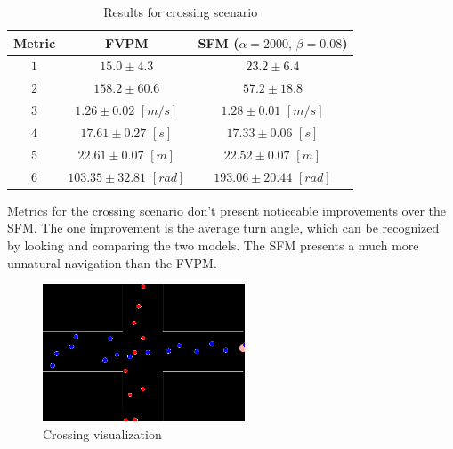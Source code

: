 \documentclass[english]{article}
\providecommand{\tabularnewline}{\\}
\begin{document}
    \begin{table}[H]
        \begin{centering}
            \begin{tabular}{|c|c|c|}
                \hline 
                Metric  & {\scriptsize{FVPM}} & {\scriptsize{SFM ($\alpha=2000,\,\beta=0.08$)}}\tabularnewline
                \hline 
                \hline 
                $1$  & {\scriptsize{$15.0\pm4.3$}} & {\scriptsize{$23.2\pm6.4$}}\tabularnewline
                \hline 
                $2$  & {\scriptsize{$158.2\pm60.6$}} & {\scriptsize{$57.2\pm18.8$}}\tabularnewline
                \hline 
                $3$  & {\scriptsize{$1.26\pm0.02$ $[m/s]$}} & {\scriptsize{$1.28\pm0.01$ $[m/s]$}}\tabularnewline
                \hline 
                $4$  & {\scriptsize{$17.61\pm0.27$ $[s]$}} & {\scriptsize{$17.33\pm0.06$ $[s]$}}\tabularnewline
                \hline 
                $5$  & {\scriptsize{$22.61\pm0.07$ $[m]$}} & {\scriptsize{$22.52\pm0.07$ $[m]$}}\tabularnewline
                \hline 
                $6$  & {\scriptsize{$103.35\pm32.81$ $[rad]$}} & {\scriptsize{$193.06\pm20.44$ $[rad]$}}\tabularnewline
                \hline 
            \end{tabular}
        \par\end{centering}
        \caption{Results for crossing scenario \label{table:metric-crossing}}
    \end{table}

    Metrics for the crossing scenario don't present noticeable improvements over the SFM.
    The one improvement is the average turn angle, which can be recognized by looking
    and comparing the two models. The SFM presents a much more unnatural navigation than
    the FVPM.
    
    \begin{figure}[H]
        \begin{centering}
            \includegraphics[width=6cm]{pics/program/crossing-no-future} 
            \par
        \end{centering}
        \caption{\label{fig:crossing-no-future}Crossing visualization}
    \end{figure}
\end{document}
